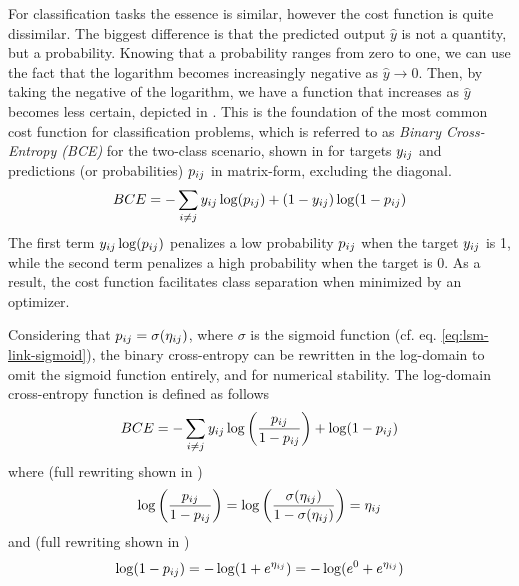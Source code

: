         For classification tasks the essence is similar, however the cost function is quite dissimilar. The biggest difference is that the predicted output $\hat{y}$ is not a quantity, but a probability. Knowing that a probability ranges from zero to one, we can use the fact that the logarithm becomes increasingly negative as $\hat{y}\rightarrow0$. Then, by taking the negative of the logarithm, we have a function that increases as $\hat{y}$ becomes less certain, depicted in .
        This is the foundation of the most common cost function for classification problems, which is referred to as \emph{Binary Cross-Entropy (BCE)} for the two-class scenario, shown in  for targets $\sub(y)$ and predictions (or probabilities) $\sub(p)$ in matrix-form, excluding the diagonal.
        \begin{equation}\label{eq:mopt-bceloss}
            BCE = -\sum_{i\neq j} \sub(y)\log(\sub(p))+(1-\sub(y))\log(1-\sub(p))
        \end{equation}
        The first term $\sub(y)\log(\sub(p))$ penalizes a low probability $\sub(p)$ when the target $\sub(y)$ is 1, while the second term penalizes a high probability when the target is 0. As a result, the cost function facilitates class separation when minimized by an optimizer.
        
        Considering that $\sub(p)=\sigma(\sub(\eta))$, where $\sigma$ is the sigmoid function (cf. eq. \ref{eq:lsm-link-sigmoid}), the binary cross-entropy can be rewritten in the log-domain to omit the sigmoid function entirely, and for numerical stability. The log-domain cross-entropy function is defined as follows
        \begin{equation}\label{eq:bce-log-domain}
            BCE = -\sum_{i\neq j} \sub(y)\log\left(\frac{\sub(p)}{1-\sub(p)}\right) + \log(1-\sub(p))
        \end{equation}
        where (full rewriting shown in )
        \begin{equation}\label{eq:bce-rewrite-first}
            \log\left(\frac{\sub(p)}{1-\sub(p)}\right) =
            \log\left(\frac{\sigma(\sub(\eta))}{1-\sigma(\sub(\eta))}\right) = \sub(\eta)
        \end{equation}
        and (full rewriting shown in )
        \begin{equation}\label{eq:bce-rewrite-second}
            \log(1-\sub(p))=-\log(1+e^{\sub(\eta)})=-\log(e^0+e^{\sub(\eta)})
        \end{equation}
        

